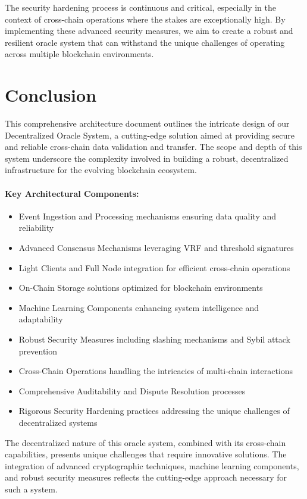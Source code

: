 \documentclass[12pt,a4paper]{article}
\begin{document}
The security hardening process is continuous and critical, especially in the context of cross-chain operations where the stakes are exceptionally high. By implementing these advanced security measures, we aim to create a robust and resilient oracle system that can withstand the unique challenges of operating across multiple blockchain environments.
	
\section{Conclusion}

This comprehensive architecture document outlines the intricate design of our Decentralized Oracle System, a cutting-edge solution aimed at providing secure and reliable cross-chain data validation and transfer. The scope and depth of this system underscore the complexity involved in building a robust, decentralized infrastructure for the evolving blockchain ecosystem.

\paragraph{Key Architectural Components:}
\begin{itemize}
	\item Event Ingestion and Processing mechanisms ensuring data quality and reliability
	\item Advanced Consensus Mechanisms leveraging VRF and threshold signatures
	\item Light Clients and Full Node integration for efficient cross-chain operations
	\item On-Chain Storage solutions optimized for blockchain environments
	\item Machine Learning Components enhancing system intelligence and adaptability
	\item Robust Security Measures including slashing mechanisms and Sybil attack prevention
	\item Cross-Chain Operations handling the intricacies of multi-chain interactions
	\item Comprehensive Auditability and Dispute Resolution processes
	\item Rigorous Security Hardening practices addressing the unique challenges of decentralized systems
\end{itemize}

The decentralized nature of this oracle system, combined with its cross-chain capabilities, presents unique challenges that require innovative solutions. The integration of advanced cryptographic techniques, machine learning components, and robust security measures reflects the cutting-edge approach necessary for such a system.
\end{document}
